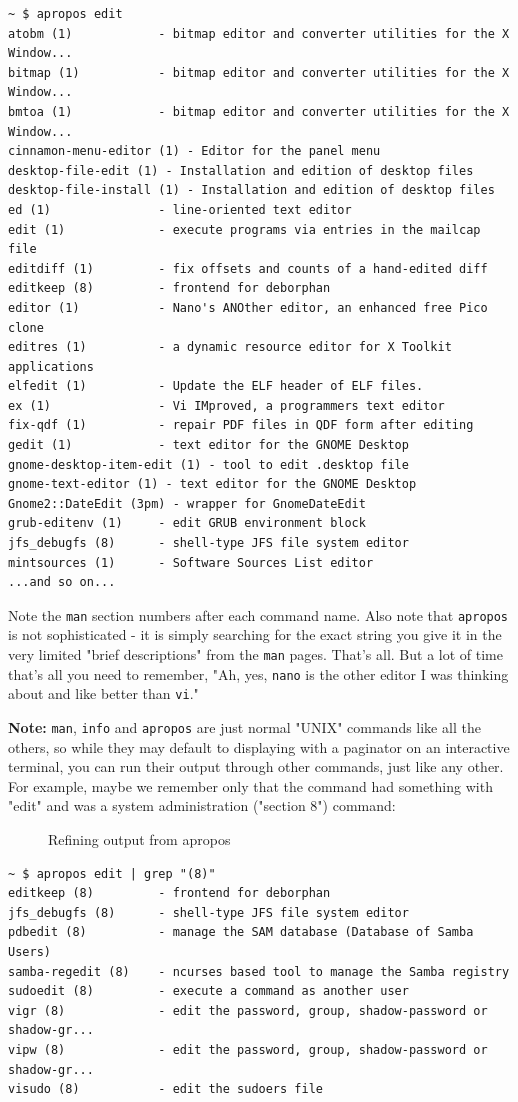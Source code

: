 \documentclass[10pt,]{book}
\numberwithin{figure}{chapter}
\DeclareRobustCommand{\drcap}[1]{\begin{figure}[H]\caption{#1}\end{figure}}
\begin{document}
\begin{verbatim}
~ $ apropos edit
atobm (1)            - bitmap editor and converter utilities for the X Window...
bitmap (1)           - bitmap editor and converter utilities for the X Window...
bmtoa (1)            - bitmap editor and converter utilities for the X Window...
cinnamon-menu-editor (1) - Editor for the panel menu
desktop-file-edit (1) - Installation and edition of desktop files
desktop-file-install (1) - Installation and edition of desktop files
ed (1)               - line-oriented text editor
edit (1)             - execute programs via entries in the mailcap file
editdiff (1)         - fix offsets and counts of a hand-edited diff
editkeep (8)         - frontend for deborphan
editor (1)           - Nano's ANOther editor, an enhanced free Pico clone
editres (1)          - a dynamic resource editor for X Toolkit applications
elfedit (1)          - Update the ELF header of ELF files.
ex (1)               - Vi IMproved, a programmers text editor
fix-qdf (1)          - repair PDF files in QDF form after editing
gedit (1)            - text editor for the GNOME Desktop
gnome-desktop-item-edit (1) - tool to edit .desktop file
gnome-text-editor (1) - text editor for the GNOME Desktop
Gnome2::DateEdit (3pm) - wrapper for GnomeDateEdit
grub-editenv (1)     - edit GRUB environment block
jfs_debugfs (8)      - shell-type JFS file system editor
mintsources (1)      - Software Sources List editor
...and so on...
\end{verbatim}

Note the \texttt{man} section numbers after each command name. Also note
that \texttt{apropos} is not sophisticated - it is simply searching for
the exact string you give it in the very limited "brief descriptions"
from the \texttt{man} pages. That's all. But a lot of time that's all
you need to remember, "Ah, yes, \texttt{nano} is the other editor I was
thinking about and like better than \texttt{vi}."

\textbf{Note:} \texttt{man}, \texttt{info} and \texttt{apropos} are just
normal "UNIX" commands like all the others, so while they may default to
displaying with a paginator on an interactive terminal, you can run
their output through other commands, just like any other. For example,
maybe we remember only that the command had something with "edit" and
was a system administration ("section 8") command:

\drcap{Refining output from apropos}

\begin{verbatim}
~ $ apropos edit | grep "(8)"
editkeep (8)         - frontend for deborphan
jfs_debugfs (8)      - shell-type JFS file system editor
pdbedit (8)          - manage the SAM database (Database of Samba Users)
samba-regedit (8)    - ncurses based tool to manage the Samba registry
sudoedit (8)         - execute a command as another user
vigr (8)             - edit the password, group, shadow-password or shadow-gr...
vipw (8)             - edit the password, group, shadow-password or shadow-gr...
visudo (8)           - edit the sudoers file
\end{verbatim}
\end{document}

